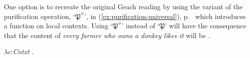 \label{pg:donkey-purification-universal}
One option is to recreate the original Geach reading by
using the variant of the purification operation, `$\mathfrak{P}^\forall$', in
(\ref{ex:purification-universal}), p.~\pageref{ex:purification-universal} which introduces a function on local contexts.
Using `$\mathfrak{P}^\forall$' instead of `$\mathfrak{P}$' will have the
consequence that the content of \textit{every farmer who owns a donkey
  likes it} will be \nexteg{}.
\begin{ex} 
  $\lambda c$:\textit{Cntxt} . 
\end{ex} 

